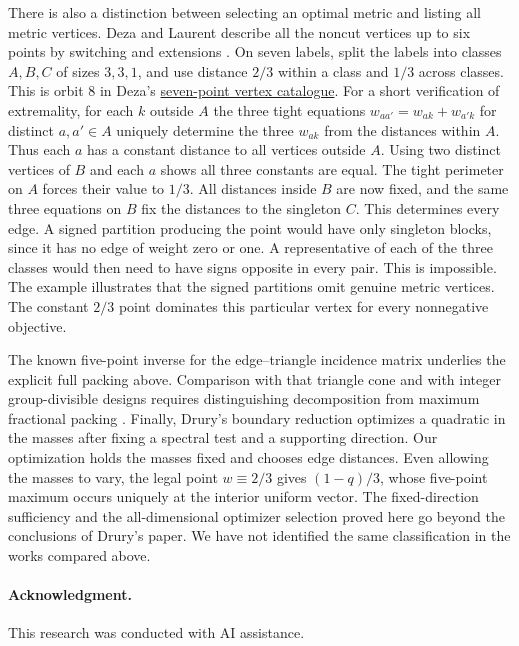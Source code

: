 \documentclass[11pt]{article}
\begin{document}
There is also a distinction between selecting an optimal metric and listing all metric vertices. Deza and Laurent describe all the noncut vertices up to six points by switching and extensions \cite[section 31.6]{Book}. On seven labels, split the labels into classes $A,B,C$ of sizes $3,3,1$, and use distance $2/3$ within a class and $1/3$ across classes. This is orbit 8 in Deza's \href{https://www.cas.mcmaster.ca/~deza/ext/metric_7.ext}{seven-point vertex catalogue}. For a short verification of extremality, for each $k$ outside $A$ the three tight equations $w_{aa'}=w_{ak}+w_{a'k}$ for distinct $a,a'\in A$ uniquely determine the three $w_{ak}$ from the distances within $A$. Thus each $a$ has a constant distance to all vertices outside $A$. Using two distinct vertices of $B$ and each $a$ shows all three constants are equal. The tight perimeter on $A$ forces their value to $1/3$. All distances inside $B$ are now fixed, and the same three equations on $B$ fix the distances to the singleton $C$. This determines every edge. A signed partition producing the point would have only singleton blocks, since it has no edge of weight zero or one. A representative of each of the three classes would then need to have signs opposite in every pair. This is impossible. The example illustrates that the signed partitions omit genuine metric vertices. The constant $2/3$ point dominates this particular vertex for every nonnegative objective.

The known five-point inverse for the edge--triangle incidence matrix \cite[Proposition 2.2]{Dukes} underlies the explicit full packing above. Comparison with that triangle cone and with integer group-divisible designs requires distinguishing decomposition from maximum fractional packing \cite{Dukes,Colbourn}. Finally, Drury's boundary reduction \cite[Lemma 12, pp.~167--168]{Drury} optimizes a quadratic in the masses after fixing a spectral test and a supporting direction. Our optimization holds the masses fixed and chooses edge distances. Even allowing the masses to vary, the legal point $w\equiv2/3$ gives $(1-q)/3$, whose five-point maximum occurs uniquely at the interior uniform vector. The fixed-direction sufficiency and the all-dimensional optimizer selection proved here go beyond the conclusions of Drury's paper. We have not identified the same classification in the works compared above.

\paragraph{Acknowledgment.} This research was conducted with AI assistance.
\end{document}
